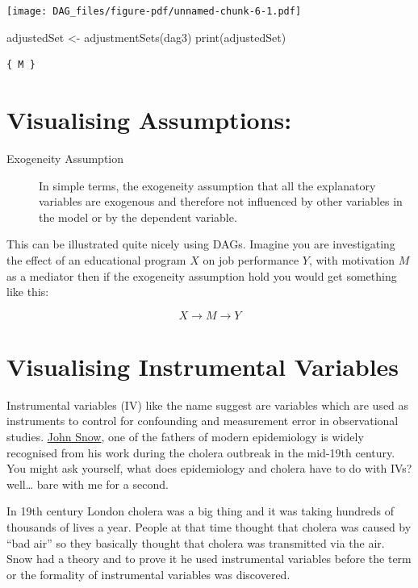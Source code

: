 \documentclass[
  letterpaper,
  DIV=11,
  numbers=noendperiod]{scrreprt}
\newenvironment{Shaded}{\begin{snugshade}}{\end{snugshade}}
\newcommand{\FunctionTok}[1]{\textcolor[rgb]{0.28,0.35,0.67}{#1}}
\newcommand{\NormalTok}[1]{\textcolor[rgb]{0.00,0.23,0.31}{#1}}
\newcommand{\OtherTok}[1]{\textcolor[rgb]{0.00,0.23,0.31}{#1}}
\theoremstyle{definition}
\theoremstyle{remark}
\begin{document}
\texttt{[image: DAG\_files/figure-pdf/unnamed-chunk-6-1.pdf]}

\begin{Shaded}
\begin{Highlighting}[]
\NormalTok{adjustedSet }\OtherTok{\textless{}{-}} \FunctionTok{adjustmentSets}\NormalTok{(dag3)}
\FunctionTok{print}\NormalTok{(adjustedSet)}
\end{Highlighting}
\end{Shaded}

\begin{verbatim}
{ M }
\end{verbatim}

\chapter{Visualising Assumptions:}\label{visualising-assumptions}

\begin{description}
\item[Exogeneity Assumption]
In simple terms, the exogeneity assumption that all the explanatory
variables are exogenous and therefore not influenced by other variables
in the model or by the dependent variable.
\end{description}

This can be illustrated quite nicely using DAGs. Imagine you are
investigating the effect of an educational program \(X\) on job
performance \(Y\), with motivation \(M\) as a mediator then if the
exogeneity assumption hold you would get something like this:

\[
X \rightarrow M \rightarrow Y
\]

\chapter{Visualising Instrumental
Variables}\label{visualising-instrumental-variables}

Instrumental variables (IV) like the name suggest are variables which
are used as instruments to control for confounding and measurement error
in observational studies.
\href{https://en.wikipedia.org/wiki/John_Snow}{John Snow}, one of the
fathers of modern epidemiology is widely recognised from his work during
the cholera outbreak in the mid-19th century. You might ask yourself,
what does epidemiology and cholera have to do with IVs? well\ldots{}
bare with me for a second.

In 19th century London cholera was a big thing and it was taking
hundreds of thousands of lives a year. People at that time thought that
cholera was caused by ``bad air'' so they basically thought that cholera
was transmitted via the air. Snow had a theory and to prove it he used
instrumental variables before the term or the formality of instrumental
variables was discovered.
\end{document}
